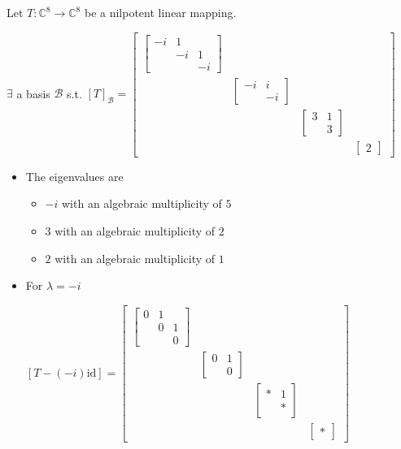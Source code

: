 \documentclass[11pt,fleqn]{book} %
\begin{document}
\begin{example}
    Let $T: \mathbb{C}^8 \to \mathbb{C}^8$ be a nilpotent linear mapping. 
        
    $\exists$ a basis $\mathcal{B}$ s.t. $[T]_\mathcal{B} = \begin{bmatrix} \begin{bmatrix} -i &1 \\ &-i &1 \\ & &-i \end{bmatrix} \\ &\begin{bmatrix} -i &i \\ &-i \end{bmatrix} \\ & &\begin{bmatrix} 3 &1 \\ &3 \end{bmatrix} \\ & && \begin{bmatrix} 2 \end{bmatrix} \end{bmatrix}$
    
    \begin{itemize}
    \item The eigenvalues are
        \begin{itemize}
            \item $-i$ with an algebraic multiplicity of $5$
            \item $3$ with an algebraic multiplicity of $2$
            \item $2$ with an algebraic multiplicity of $1$
        \end{itemize}
        
        \item For $\lambda = -i$
        
        $[T - (-i)\mathrm{id}] = \begin{bmatrix} \begin{bmatrix} 0 &1 \\ &0 &1 \\ & &0 \end{bmatrix} \\ &\begin{bmatrix} 0 &1 \\ &0 \end{bmatrix} \\ & &\begin{bmatrix} * &1 \\ &* \end{bmatrix} \\ & && \begin{bmatrix} * \end{bmatrix} \end{bmatrix}$
        

\end{itemize}
\end{example}
\end{document}
